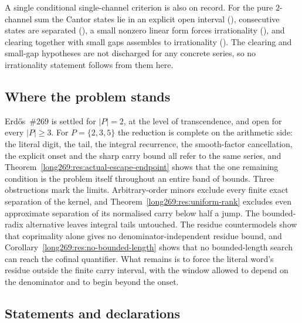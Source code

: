 A single conditional single-channel criterion is also on record.  For the pure
$2$-channel sum the Cantor states lie in an explicit open interval
(),
consecutive states are separated
(), a small nonzero linear form forces irrationality
(),
and clearing together with small gaps assembles to irrationality
().
The clearing and small-gap hypotheses are not discharged for any concrete
series, so no irrationality statement follows from them here.

\subsection{Where the problem stands}

Erd\H{o}s~\#269 is settled for $|P|=2$, at the level of transcendence, and open
for every $|P|\ge3$.  For $P=\{2,3,5\}$ the reduction is complete on the
arithmetic side: the literal digit, the tail, the integral recurrence, the
smooth-factor cancellation, the explicit onset and the sharp carry bound all
refer to the same series, and Theorem~\ref{long269:res:actual-escape-endpoint} shows
that the one remaining condition is the problem itself throughout an entire
band of bounds.  Three obstructions mark the limits.  Arbitrary-order minors
exclude every finite exact separation of the kernel, and
Theorem~\ref{long269:res:uniform-rank} excludes even approximate separation of its
normalised carry below half a jump.  The bounded-radix alternative leaves
integral tails untouched.  The residue countermodels show that coprimality
alone gives no denominator-independent residue bound, and
Corollary~\ref{long269:res:no-bounded-length} shows that no bounded-length search can
reach the cofinal quantifier.  What remains is to force the literal word's
residue outside the finite carry interval, with the window allowed to depend on
the denominator and to begin beyond the onset.

\subsection*{Statements and declarations}

